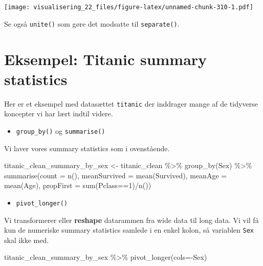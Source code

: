 \documentclass[
]{book}
\newenvironment{Shaded}{\begin{snugshade}}{\end{snugshade}}
\newcommand{\AttributeTok}[1]{\textcolor[rgb]{0.77,0.63,0.00}{#1}}
\newcommand{\DecValTok}[1]{\textcolor[rgb]{0.00,0.00,0.81}{#1}}
\newcommand{\FunctionTok}[1]{\textcolor[rgb]{0.00,0.00,0.00}{#1}}
\newcommand{\NormalTok}[1]{#1}
\newcommand{\OtherTok}[1]{\textcolor[rgb]{0.56,0.35,0.01}{#1}}
\newcommand{\SpecialCharTok}[1]{\textcolor[rgb]{0.00,0.00,0.00}{#1}}
\providecommand{\tightlist}{%
  \setlength{\itemsep}{0pt}\setlength{\parskip}{0pt}}
\begin{document}
\texttt{[image: visualisering\_22\_files/figure-latex/unnamed-chunk-310-1.pdf]}

Se også \texttt{unite()} som gøre det modsatte til \texttt{separate()}.

\hypertarget{eksempel-titanic-summary-statistics}{%
\section{Eksempel: Titanic summary statistics}\label{eksempel-titanic-summary-statistics}}

Her er et eksempel med datasættet \texttt{titanic} der inddrager mange af de tidyverse koncepter vi har lært indtil videre.

\begin{itemize}
\tightlist
\item
  \texttt{group\_by()} og \texttt{summarise()}
\end{itemize}

Vi laver vores summary statistics som i ovenstående.

\begin{Shaded}
\begin{Highlighting}[]
\NormalTok{titanic\_clean\_summary\_by\_sex }\OtherTok{\textless{}{-}}\NormalTok{ titanic\_clean }\SpecialCharTok{\%\textgreater{}\%}  
  \FunctionTok{group\_by}\NormalTok{(Sex) }\SpecialCharTok{\%\textgreater{}\%} 
  \FunctionTok{summarise}\NormalTok{(}\AttributeTok{count =} \FunctionTok{n}\NormalTok{(),}
            \AttributeTok{meanSurvived =} \FunctionTok{mean}\NormalTok{(Survived),}
            \AttributeTok{meanAge =} \FunctionTok{mean}\NormalTok{(Age),}
            \AttributeTok{propFirst =} \FunctionTok{sum}\NormalTok{(Pclass}\SpecialCharTok{==}\DecValTok{1}\NormalTok{)}\SpecialCharTok{/}\FunctionTok{n}\NormalTok{())}
\end{Highlighting}
\end{Shaded}

\begin{itemize}
\tightlist
\item
  \texttt{pivot\_longer()}
\end{itemize}

Vi transformerer eller \textbf{reshape} datarammen fra wide data til long data. Vi vil få kun de numeriske summary statistics samlede i en enkel kolon, så variablen \texttt{Sex} skal ikke med.

\begin{Shaded}
\begin{Highlighting}[]
\NormalTok{titanic\_clean\_summary\_by\_sex }\SpecialCharTok{\%\textgreater{}\%} \FunctionTok{pivot\_longer}\NormalTok{(}\AttributeTok{cols=}\SpecialCharTok{{-}}\NormalTok{Sex)}
\end{Highlighting}
\end{Shaded}
\end{document}
